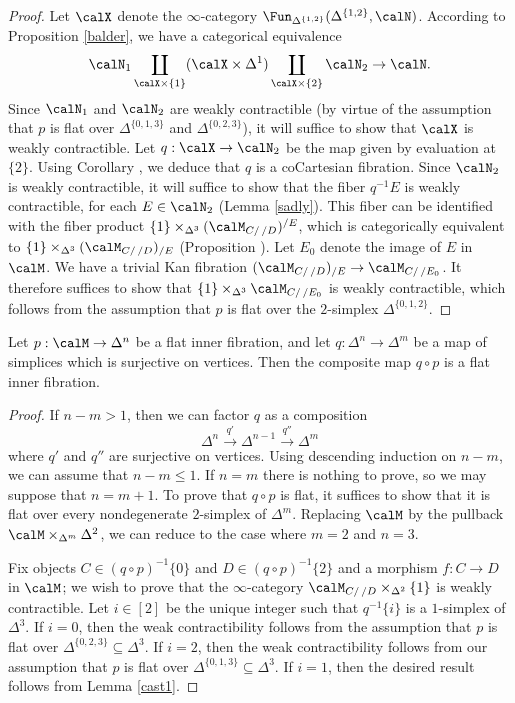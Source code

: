 \begin{proof}
Let $\calX$ denote the $\infty$-category $\Fun_{ \Delta^{ \{1,2\} }}( \Delta^{ \{1,2\} }, \calN)$.
According to Proposition \ref{balder}, we have a categorical equivalence
$$ \calN_{1} \coprod_{ \calX \times \{1\} } ( \calX \times \Delta^1) \coprod_{ \calX \times \{2\} } \calN_{2} \rightarrow \calN.$$
Since $\calN_{1}$ and $\calN_{2}$ are weakly contractible (by virtue of the assumption that
$p$ is flat over $\Delta^{ \{0,1,3\} }$ and $\Delta^{ \{0,2,3\} }$), it will suffice to show that
$\calX$ is weakly contractible. Let $q: \calX \rightarrow \calN_2$ be the map given by
evaluation at $\{2\}$. Using Corollary , we deduce that
$q$ is a coCartesian fibration. Since $\calN_2$ is weakly contractible, it will suffice
to show that the fiber $q^{-1} E$ is weakly contractible, for each $E \in \calN_2$
(Lemma \ref{sadly}). This fiber can be identified with the fiber product
$\{ 1\} \times_{ \Delta^3} ( \calM_{ C/\,/D})^{/E}$, which is categorically
equivalent to $\{1\} \times_{ \Delta^3} ( \calM_{ C/ \, /D})_{/E}$ 
(Proposition ). Let $E_0$ denote the image of $E$ in $\calM$. We
have a trivial Kan fibration $( \calM_{C/ \, /D})_{/E} \rightarrow \calM_{C/ \, /E_0}$.
It therefore suffices to show that $\{1\} \times_{ \Delta^3} \calM_{ C/ \, /E_0}$ is weakly contractible, which follows from the assumption that $p$ is flat over the $2$-simplex $\Delta^{ \{0,1,2\} }$. 
\end{proof}

\begin{lemma}\label{custer}
Let $p: \calM \rightarrow \Delta^n$ be a flat inner fibration, and let
$q: \Delta^n \rightarrow \Delta^m$ be a map of simplices which is surjective on vertices. Then the
composite map $q \circ p$ is a flat inner fibration.
\end{lemma}

\begin{proof}
If $n - m > 1$, then we can factor $q$ as a composition
$$ \Delta^{n} \stackrel{q'}{\rightarrow} \Delta^{n-1} \stackrel{q''}{\rightarrow} \Delta^m$$
where $q'$ and $q''$ are surjective on vertices. Using descending induction on $n-m$,
we can assume that $n-m \leq 1$. If $n=m$ there is nothing to prove, so we may suppose
that $n = m+1$. To prove that $q \circ p$ is flat, it suffices to show that it is flat over
every nondegenerate $2$-simplex of $\Delta^m$. Replacing
$\calM$ by the pullback $\calM \times_{ \Delta^m} \Delta^2$, we can reduce to the
case where $m=2$ and $n=3$.

Fix objects $C \in (q \circ p)^{-1} \{0\}$ and $D \in (q \circ p)^{-1} \{2\}$ and a morphism
$f: C \rightarrow D$ in $\calM$; we wish to prove
that the $\infty$-category $\calM_{C/ \, /D} \times_{ \Delta^2} \{1\}$ is weakly contractible.
Let $i \in [2]$ be the unique integer such that $q^{-1} \{i\}$ is a $1$-simplex of $\Delta^3$.
If $i = 0$, then the weak contractibility follows from the assumption that
$p$ is flat over $\Delta^{ \{0, 2, 3 \} } \subseteq \Delta^3$. If $i=2$,
then the weak contractibility follows from our assumption that $p$ is flat over
$\Delta^{ \{0,1, 3\} } \subseteq \Delta^3$. If $i = 1$, then the desired result follows from
Lemma \ref{cast1}.
\end{proof}

